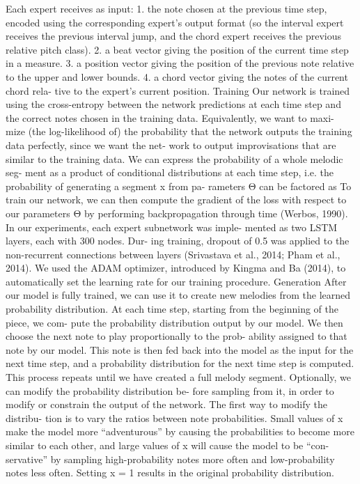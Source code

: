 Each expert receives as input:
1. the note chosen at the previous time step, encoded using the corresponding expert’s output format (so the interval expert receives the previous interval jump, and the chord expert receives the previous relative pitch class).
2. a beat vector giving the position of the current time step in a measure.
3. a position vector giving the position of the previous note relative to the upper and lower bounds.
4. a chord vector giving the notes of the current chord rela- tive to the expert’s current position.
Training
Our network is trained using the cross-entropy between the network predictions at each time step and the correct notes chosen in the training data. Equivalently, we want to maxi- mize (the log-likelihood of) the probability that the network outputs the training data perfectly, since we want the net- work to output improvisations that are similar to the training data. We can express the probability of a whole melodic seg- ment as a product of conditional distributions at each time step, i.e. the probability of generating a segment x from pa- rameters Θ can be factored as To train our network, we can then compute the gradient of the loss with respect to our parameters Θ by performing backpropagation through time (Werbos, 1990). In our experiments, each expert subnetwork was imple-
mented as two LSTM layers, each with 300 nodes. Dur- ing training, dropout of 0.5 was applied to the non-recurrent connections between layers (Srivastava et al., 2014; Pham et al., 2014). We used the ADAM optimizer, introduced by Kingma and Ba (2014), to automatically set the learning rate for our training procedure.
Generation
After our model is fully trained, we can use it to create new melodies from the learned probability distribution. At each time step, starting from the beginning of the piece, we com- pute the probability distribution output by our model. We then choose the next note to play proportionally to the prob- ability assigned to that note by our model. This note is then fed back into the model as the input for the next time step, and a probability distribution for the next time step is computed. This process repeats until we have created a full melody segment. Optionally, we can modify the probability distribution be-
fore sampling from it, in order to modify or constrain the output of the network. The first way to modify the distribu- tion is to vary the ratios between note probabilities.
Small values of x make the model more “adventurous” by causing the probabilities to become more similar to each other, and large values of x will cause the model to be “con- servative” by sampling high-probability notes more often and low-probability notes less often. Setting x = 1 results in the original probability distribution. 


